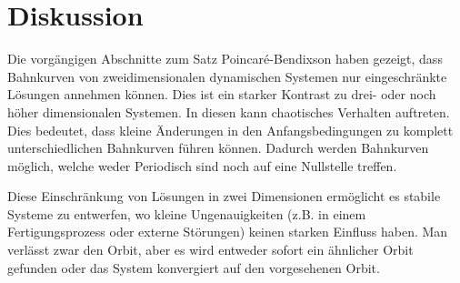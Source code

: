 \section{Diskussion} \label{poinbendix:section:diskussion}
Die vorgängigen Abschnitte zum Satz Poincaré-Bendixson haben gezeigt, dass Bahnkurven von zweidimensionalen dynamischen Systemen nur eingeschränkte Lösungen annehmen können.
Dies ist ein starker Kontrast zu drei- oder noch höher dimensionalen Systemen.
In diesen kann chaotisches Verhalten auftreten.
Dies bedeutet, dass kleine Änderungen in den Anfangsbedingungen zu komplett unterschiedlichen Bahnkurven führen können.
Dadurch werden Bahnkurven möglich, welche weder Periodisch sind noch auf eine Nullstelle treffen.

Diese Einschränkung von Lösungen in zwei Dimensionen ermöglicht es stabile Systeme zu entwerfen, wo kleine Ungenauigkeiten (z.B. in einem Fertigungsprozess oder externe Störungen) keinen starken Einfluss haben.
Man verlässt zwar den Orbit, aber es wird entweder sofort ein ähnlicher Orbit gefunden oder das System konvergiert auf den vorgesehenen Orbit.
